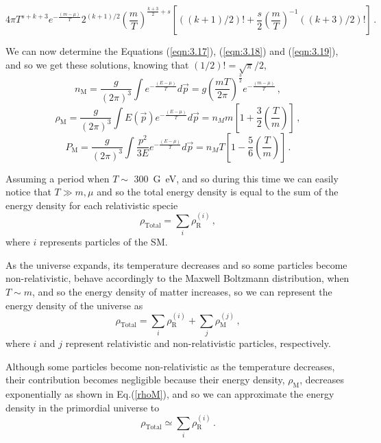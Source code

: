 \begin{equation}
	\label{eqn:3.24}
	4\pi T^{s+k+3}e^{-\frac{(m-\mu)}{T}} 2^{(k+1)/2} \left( \frac{m}{T}\right)^{\frac{k+3}{2}+s}
	\left[\left((k+1)/2\right)!+\frac{s}{2}\left(\frac{m}{T}\right)^{-1}\left((k+3)/2\right)!\right]\,.
\end{equation}

We can now determine the Equations (\ref{eqn:3.17}), (\ref{eqn:3.18}) and (\ref{eqn:3.19}), and so we get these solutions, knowing that $(1/2)!=\sqrt{\pi}/2$,
\begin{equation}
	\label{nM}
	n_{\textrm{M}}=\frac{g}{(2\pi)^3}\int e^{-\frac{(E-\mu)}{T}} d\vec{p}=g\left( \frac{mT}{2\pi}\right)^{\frac{3}{2}}e^{-\frac{(m-\mu)}{T}}\,,
\end{equation}
\begin{equation}
	\label{rhoM}
	\rho_{\textrm{M}}=\frac{g}{(2\pi)^3}\int E(\vec{p})e^{-\frac{(E-\mu)}{T}} d\vec{p}=n_{M}m\left[1+\frac{3}{2}\left(\frac{T}{m}\right)\right]\,,
\end{equation} 
\begin{equation}
	\label{PM}
	P_{\textrm{M}}=\frac{g}{(2\pi)^3}\int \frac{p^2}{3E}e^{-\frac{(E-\mu)}{T}} d\vec{p}=n_{M} 
	T\left[1-\frac{5}{6}\left(\frac{T}{m}\right)\right]\,.
\end{equation}


Assuming a period when $T \sim$ \SI{300}{G\eV}, and so during this time we can easily notice that $T\gg m,\mu$ and so the total energy density is equal to the sum of the energy density for each relativistic specie
\begin{equation}
	\rho_{\textrm{Total}}=\sum\limits_{i} \rho_\textrm{R}^{(i)}\,,
\end{equation}
where $i$ represents particles of the SM.

As the universe expands, its temperature decreases and so some particles become non-relativistic, behave accordingly to the Maxwell Boltzmann distribution, when $T \sim m$, and so the energy density of matter increases, so we can represent the energy density of the universe as
\begin{equation}
	\rho_{\textrm{Total}}=\sum\limits_{i}\rho_{\textrm{R}}^{(i)}+\sum\limits_{j}\rho_{\textrm{M}}^{(j)}\,,
\end{equation}
where $i$ and $j$ represent relativistic and non-relativistic particles, respectively.

Although some particles become non-relativistic as the temperature decreases, their contribution becomes negligible because their energy density, $\rho_{\textrm{M}}$, decreases exponentially as shown in Eq.(\ref{rhoM}), and so we can approximate the energy density in the primordial universe to
\begin{equation}
	\rho_{\textrm{Total}}\simeq\sum\limits_{i}\rho_{\textrm{R}}^{(i)}\,.
\end{equation}

